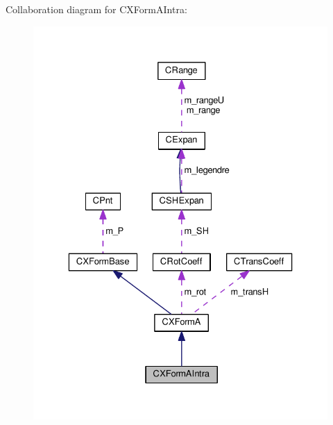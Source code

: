 Collaboration diagram for C\-X\-Form\-A\-Intra\-:\nopagebreak
\begin{figure}[H]
\begin{center}
\leavevmode
\includegraphics[width=329pt]{classCXFormAIntra__coll__graph}
\end{center}
\end{figure}
